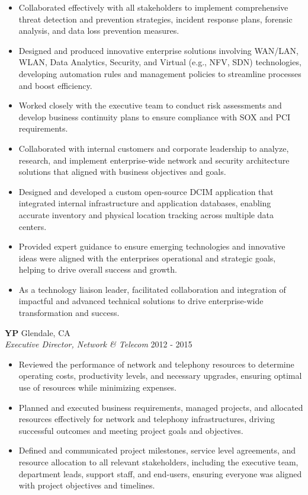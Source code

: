 \documentclass[a4paper]{article}
\begin{document}
\begin{itemize} \itemsep 1pt
	\item Collaborated effectively with all stakeholders to implement comprehensive threat detection and prevention strategies, incident response plans, forensic analysis, and data loss prevention measures.
	\item Designed and produced innovative enterprise solutions involving WAN/LAN, WLAN, Data Analytics, Security, and Virtual (e.g., NFV, SDN) technologies, developing automation rules and management policies to streamline processes and boost efficiency.
	\item Worked closely with the executive team to conduct risk assessments and develop business continuity plans to ensure compliance with SOX and PCI requirements.
	\item Collaborated with internal customers and corporate leadership to analyze, research, and implement enterprise-wide network and security architecture solutions that aligned with business objectives and goals.
	\item Designed and developed a custom open-source DCIM application that integrated internal infrastructure and application databases, enabling accurate inventory and physical location tracking across multiple data centers.
	\item Provided expert guidance to ensure emerging technologies and innovative ideas were aligned with the enterprise\textquotesingle{}s operational and strategic goals, helping to drive overall success and growth.
	\item As a technology liaison leader, facilitated collaboration and integration of impactful and advanced technical solutions to drive enterprise-wide transformation and success.
\end{itemize}
\textbf{YP} \hfill Glendale, CA\\
\textit{Executive Director, Network \& Telecom} \hfill 2012 - 2015\\
\vspace{-1mm}
\begin{itemize} \itemsep 1pt
	\item Reviewed the performance of network and telephony resources to determine operating costs, productivity levels, and necessary upgrades, ensuring optimal use of resources while minimizing expenses.
	\item Planned and executed business requirements, managed projects, and allocated resources effectively for network and telephony infrastructures, driving successful outcomes and meeting project goals and objectives.
	\item Defined and communicated project milestones, service level agreements, and resource allocation to all relevant stakeholders, including the executive team, department leads, support staff, and end-users, ensuring everyone was aligned with project objectives and timelines.
\end{itemize}
\end{document}
